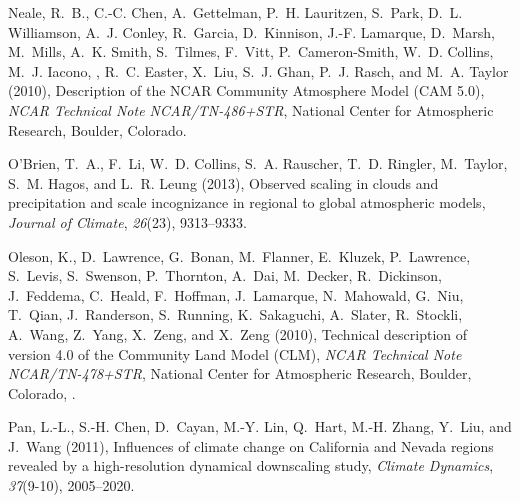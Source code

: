 \documentclass[draft,ms]{agutex}   %
\begin{document}
\begin{article}
\begin{thebibliography}{72}
Neale, R.~B., C.-C. Chen, A.~Gettelman, P.~H. Lauritzen, S.~Park, D.~L.
  Williamson, A.~J. Conley, R.~Garcia, D.~Kinnison, J.-F. Lamarque, D.~Marsh,
  M.~Mills, A.~K. Smith, S.~Tilmes, F.~Vitt, P.~Cameron-Smith, W.~D. Collins,
  M.~J. Iacono, , R.~C. Easter, X.~Liu, S.~J. Ghan, P.~J. Rasch, and M.~A.
  Taylor (2010{}), Description of the {NCAR} {C}ommunity
  {A}tmosphere {M}odel ({CAM} 5.0), \textit{NCAR Technical Note
  NCAR/TN-486+STR}, National Center for Atmospheric Research, Boulder,
  Colorado.

O'Brien, T.~A., F.~Li, W.~D. Collins, S.~A. Rauscher, T.~D. Ringler, M.~Taylor,
  S.~M. Hagos, and L.~R. Leung (2013), Observed scaling in clouds and
  precipitation and scale incognizance in regional to global atmospheric
  models, \textit{Journal of Climate}, \textit{26}(23), 9313--9333.

Oleson, K., D.~Lawrence, G.~Bonan, M.~Flanner, E.~Kluzek, P.~Lawrence,
  S.~Levis, S.~Swenson, P.~Thornton, A.~Dai, M.~Decker, R.~Dickinson,
  J.~Feddema, C.~Heald, F.~Hoffman, J.~Lamarque, N.~Mahowald, G.~Niu, T.~Qian,
  J.~Randerson, S.~Running, K.~Sakaguchi, A.~Slater, R.~Stockli, A.~Wang,
  Z.~Yang, X.~Zeng, and X.~Zeng (2010), Technical description of version 4.0 of
  the {C}ommunity {L}and {M}odel ({CLM}), \textit{NCAR Technical Note
  NCAR/TN-478+STR}, National Center for Atmospheric Research, Boulder,
  Colorado, .

Pan, L.-L., S.-H. Chen, D.~Cayan, M.-Y. Lin, Q.~Hart, M.-H. Zhang, Y.~Liu, and
  J.~Wang (2011), {Influences of climate change on California and Nevada
  regions revealed by a high-resolution dynamical downscaling study},
  \textit{Climate Dynamics}, \textit{37}(9-10), 2005--2020.


\end{thebibliography}
\end{article}
\end{document}
